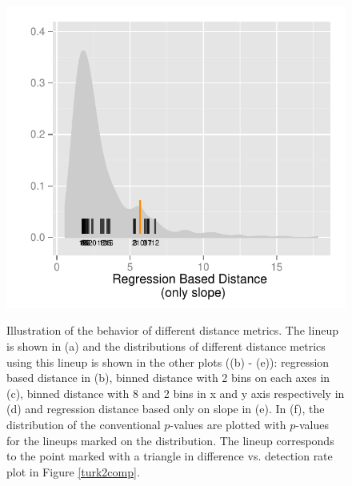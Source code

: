 \documentclass[12]{article}
\begin{document}
\begin{figure}[hbtp]
{\includegraphics[scale=0.67]{distribution-reg-no-int-dist-exp2.pdf}
\label{t2comp_1}
}
	\vspace{-.1in}
\caption[Optional caption for list of figures]{Illustration of the behavior of different distance metrics. The lineup is shown in (a) and the distributions of different distance metrics using this lineup is shown in the other plots ((b) - (e)): regression based distance in (b), binned distance with 2 bins on each axes in (c), binned distance with 8 and 2 bins in x and y axis respectively in (d) and regression distance based only on slope in (e). In (f), the distribution of the conventional $p$-values are plotted with $p$-values for the lineups marked on the distribution. The lineup corresponds to the point marked with a triangle in difference vs. detection rate plot in Figure \ref{turk2comp}.}
\label{turk2-exp}
\end{figure}
\end{document}
